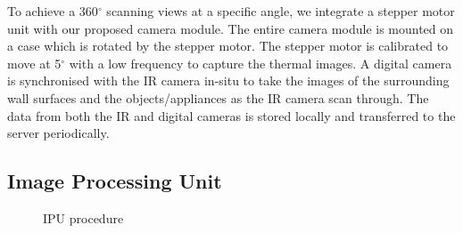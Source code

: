 	
To achieve a 360$^{\circ}$ scanning views at a specific angle, we integrate a stepper motor unit with our proposed camera module. The entire camera module is mounted on a case which is rotated by the stepper motor. The stepper motor is calibrated to move at 5$^{\circ}$ with a low frequency to capture the thermal images. A digital camera is synchronised with the IR camera in-situ to take the images of the surrounding wall surfaces and the objects/appliances as the IR camera scan through. The data from both the IR and digital cameras is stored locally and transferred to the server periodically.
	
\subsection{Image Processing Unit}
\label{sec:imageprocessing}


\begin{figure}[!htp]
	\begin{minipage}{0.00\textwidth}
		\mbox{}
	\end{minipage}
	\begin{minipage}{0.48\textwidth}
		\begin{center}
			\scriptsize{
				}
							\caption{IPU procedure}
							\label{algo:IPU}
		 \end{center}
	\end{minipage} 
\end{figure}



